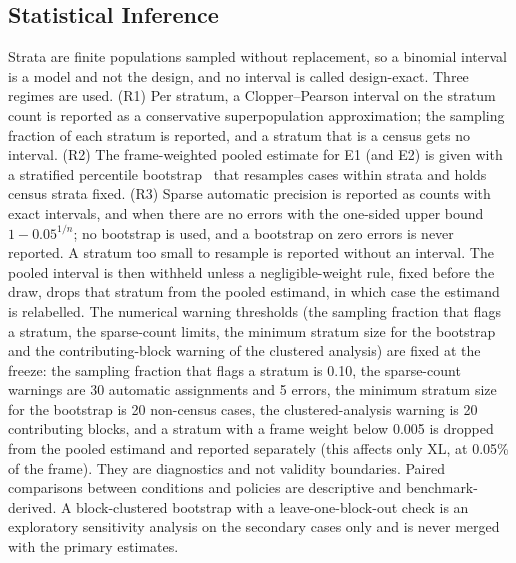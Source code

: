 \subsection{Statistical Inference}
\label{sec:inference}
Strata are finite populations sampled without replacement, so a binomial interval is a model and not the design, and no interval is called design-exact. Three regimes are used. (R1) Per stratum, a Clopper--Pearson interval on the stratum count is reported as a conservative superpopulation approximation; the sampling fraction of each stratum is reported, and a stratum that is a census gets no interval. (R2) The frame-weighted pooled estimate for E1 (and E2) is given with a stratified percentile bootstrap~\cite{efron1979bootstrap} that resamples cases within strata and holds census strata fixed. (R3) Sparse automatic precision is reported as counts with exact intervals, and when there are no errors with the one-sided upper bound $1-0.05^{1/n}$; no bootstrap is used, and a bootstrap on zero errors is never reported. A stratum too small to resample is reported without an interval. The pooled interval is then withheld unless a negligible-weight rule, fixed before the draw, drops that stratum from the pooled estimand, in which case the estimand is relabelled. The numerical warning thresholds (the sampling fraction that flags a stratum, the sparse-count limits, the minimum stratum size for the bootstrap and the contributing-block warning of the clustered analysis) are fixed at the freeze: the sampling fraction that flags a stratum is 0.10, the sparse-count warnings are 30 automatic assignments and 5 errors, the minimum stratum size for the bootstrap is 20 non-census cases, the clustered-analysis warning is 20 contributing blocks, and a stratum with a frame weight below 0.005 is dropped from the pooled estimand and reported separately (this affects only XL, at 0.05\% of the frame). They are diagnostics and not validity boundaries. Paired comparisons between conditions and policies are descriptive and benchmark-derived. A block-clustered bootstrap with a leave-one-block-out check is an exploratory sensitivity analysis on the secondary cases only and is never merged with the primary estimates.

